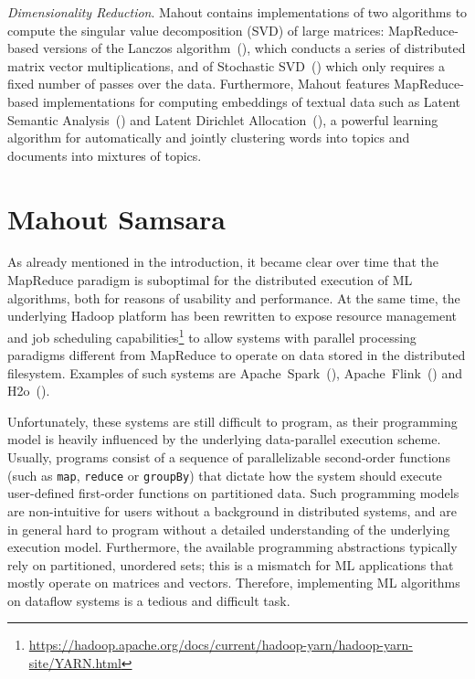 \documentclass[twoside,11pt]{article}
\begin{document}
\textit{Dimensionality Reduction}. Mahout contains implementations of two algorithms to compute the singular value decomposition (SVD) of large matrices: MapReduce-based versions of the Lanczos algorithm~(\cite{Golub2012}), which conducts a series of distributed matrix vector multiplications, and of Stochastic SVD~(\cite{Halko2012}) which only requires a fixed number of passes over the data. Furthermore, Mahout features MapReduce-based implementations for computing embeddings of textual data such as Latent Semantic Analysis~(\cite{Deerwester1990}) and Latent Dirichlet Allocation~(\cite{Blei2003}), a powerful learning algorithm for automatically and jointly clustering words into topics and documents into mixtures of topics.



\section{Mahout Samsara}
\label{sec:samsara}

As already mentioned in the introduction, it became clear over time that the MapReduce paradigm is suboptimal for the distributed execution of ML algorithms, both for reasons of usability and performance. At the same time, the underlying Hadoop platform has been rewritten to expose resource management and job scheduling capabilities\footnote{\url{https://hadoop.apache.org/docs/current/hadoop-yarn/hadoop-yarn-site/YARN.html}} to allow systems with parallel processing paradigms different from MapReduce to operate on data stored in the distributed filesystem. Examples of such systems are Apache~Spark~(\cite{Zaharia2012}), Apache~Flink~(\cite{Alexandrov2014}) and H2o~(\cite{H2O}). 

Unfortunately, these systems are still difficult to program, as their programming model is heavily influenced by the underlying data-parallel execution scheme. Usually, programs consist of a sequence of parallelizable second-order functions (such as \texttt{map}, \texttt{reduce} or \texttt{groupBy}) that dictate how the system should execute user-defined first-order functions on partitioned data. Such programming models are non-intuitive for users without a background in distributed systems, and are in general hard to program without a detailed understanding of the underlying execution model. Furthermore, the available programming abstractions typically rely on partitioned, unordered sets; this is a mismatch for ML applications that mostly operate on matrices and vectors. Therefore, implementing ML algorithms on dataflow systems is a tedious and difficult task. 
\end{document}
